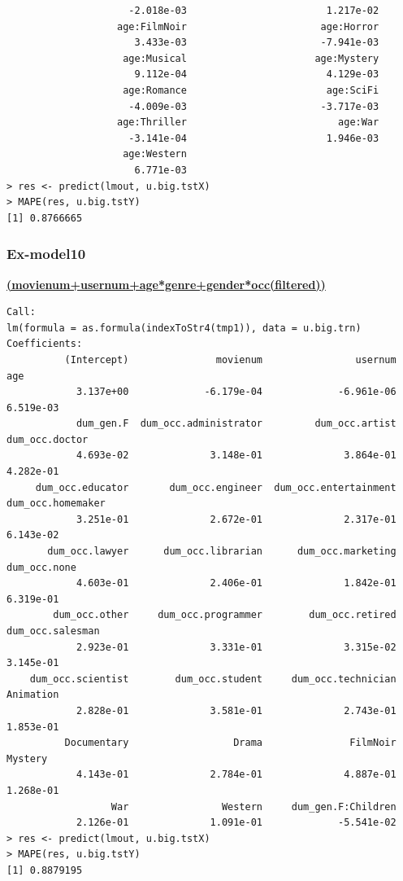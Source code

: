 \documentclass[11pt]{article}
\begin{document}
\begin{verbatim}
                     -2.018e-03                        1.217e-02  
                   age:FilmNoir                       age:Horror  
                      3.433e-03                       -7.941e-03  
                    age:Musical                      age:Mystery  
                      9.112e-04                        4.129e-03  
                    age:Romance                        age:SciFi  
                     -4.009e-03                       -3.717e-03  
                   age:Thriller                          age:War  
                     -3.141e-04                        1.946e-03  
                    age:Western  
                      6.771e-03    
> res <- predict(lmout, u.big.tstX)
> MAPE(res, u.big.tstY)
[1] 0.8766665
\end{verbatim}

\subsubsection{Ex-model10}
\textbf{\underline{(movienum+usernum+age*genre+gender*occ(filtered))}}
\begin{verbatim}
Call:
lm(formula = as.formula(indexToStr4(tmp1)), data = u.big.trn)
Coefficients:
          (Intercept)               movienum                usernum                    age
            3.137e+00             -6.179e-04             -6.961e-06              6.519e-03
            dum_gen.F  dum_occ.administrator         dum_occ.artist         dum_occ.doctor
            4.693e-02              3.148e-01              3.864e-01              4.282e-01
     dum_occ.educator       dum_occ.engineer  dum_occ.entertainment      dum_occ.homemaker
            3.251e-01              2.672e-01              2.317e-01              6.143e-02
       dum_occ.lawyer      dum_occ.librarian      dum_occ.marketing           dum_occ.none
            4.603e-01              2.406e-01              1.842e-01              6.319e-01
        dum_occ.other     dum_occ.programmer        dum_occ.retired       dum_occ.salesman
            2.923e-01              3.331e-01              3.315e-02              3.145e-01
    dum_occ.scientist        dum_occ.student     dum_occ.technician              Animation
            2.828e-01              3.581e-01              2.743e-01              1.853e-01
          Documentary                  Drama               FilmNoir                Mystery
            4.143e-01              2.784e-01              4.887e-01              1.268e-01
                  War                Western     dum_gen.F:Children
            2.126e-01              1.091e-01             -5.541e-02
> res <- predict(lmout, u.big.tstX)
> MAPE(res, u.big.tstY)
[1] 0.8879195
\end{verbatim}
\end{document}
